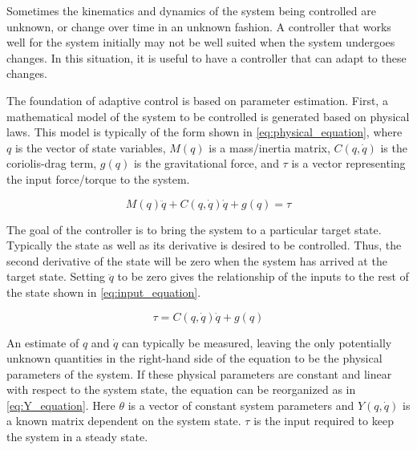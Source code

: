 \documentclass[letterpaper,12pt,titlepage,oneside,final]{book}
\begin{document}

Sometimes the kinematics and dynamics of the system being controlled are unknown, or change over time in an unknown fashion. 
A controller that works well for the system initially may not be well suited when the system undergoes changes. 
In this situation, it is useful to have a controller that can adapt to these changes.

The foundation of adaptive control is based on parameter estimation. 
First, a mathematical model of the system to be controlled is generated based on physical laws. 
This model is typically of the form shown in \eqref{eq:physical_equation}, where $q$ is the vector of state variables, $M(q)$ is a mass/inertia matrix, $C(q,\dot{q})$ is the coriolis-drag term, $g(q)$ is the gravitational force, and $\tau$ is a vector representing the input force/torque to the system.

\begin{equation} \label{eq:physical_equation}
M(q)\ddot{q} + C(q,\dot{q})\dot{q} + g(q) = \tau
\end{equation}

The goal of the controller is to bring the system to a particular target state.
Typically the state as well as its derivative is desired to be controlled.
Thus, the second derivative of the state will be zero when the system has arrived at the target state.
Setting $\ddot{q}$ to be zero gives the relationship of the inputs to the rest of the state shown in \eqref{eq:input_equation}.

\begin{equation} \label{eq:input_equation}
\tau = C(q,\dot{q})\dot{q} + g(q)
\end{equation}

An estimate of $q$ and $\dot{q}$ can typically be measured, leaving the only potentially unknown quantities in the right-hand side of the equation to be the physical parameters of the system.
If these physical parameters are constant and linear with respect to the system state, the equation can be reorganized as in \eqref{eq:Y_equation}.
Here $\theta$ is a vector of constant system parameters and $Y(q,\dot{q})$ is a known matrix dependent on the system state. 
$\tau$ is the input required to keep the system in a steady state.
\end{document}
